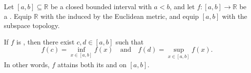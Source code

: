 \begin{theorem} \label{theorem:extreme_value_theorem_that_continuous_functions_on_real_closed_bounded_intervals_valued_in_the_real_numbers_attain_minimum_and_maximum}
    Let $[a, b] \subseteq \mathbb{R}$ be a closed bounded interval with $a < b$, and let $f : [a, b] \to \mathbb{R}$ be a . Equip $\mathbb{R}$ with the  induced by the Euclidean metric, and equip $[a, b]$ with the subspace topology.

    If $f$ is , then there exist $c, d \in [a, b]$ such that
    $$f(c) = \inf_{x \in [a,b]} f(x) \quad \text{and} \quad f(d) = \sup_{x \in [a,b]} f(x).$$
    In other words, $f$ attains both its  and  on $[a, b]$.
\end{theorem}



